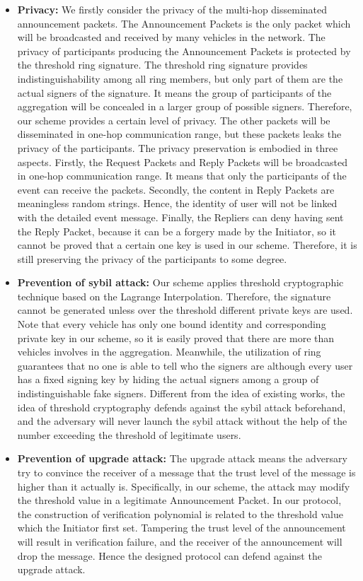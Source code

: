 \documentclass[a4paper]{article}
\begin{document}
\begin{itemize}
  \item \textbf{Privacy:} We firstly consider the privacy of the multi-hop disseminated announcement packets. The Announcement Packets is the only packet which will be broadcasted and received by many vehicles in the network. The privacy of participants producing the Announcement Packets is protected by the threshold ring signature. The threshold ring signature provides indistinguishability among all ring members, but only part of them are the actual signers of the signature. It means the group of participants of the aggregation will be concealed in a larger group of possible signers. Therefore, our scheme provides a certain level of privacy. The other packets will be disseminated in one-hop communication range, but these packets leaks the privacy of the participants. The privacy preservation is embodied in three aspects. Firstly, the Request Packets and Reply Packets will be broadcasted in one-hop communication range. It means that only the participants of the event can receive the packets. Secondly, the content in Reply Packets are meaningless random strings. Hence, the identity of user will not be linked with the detailed event message. Finally, the Repliers can deny having sent the Reply Packet, because it can be a forgery made by the Initiator, so it cannot be proved that a certain one key is used in our scheme. Therefore, it is still preserving the privacy of the participants to some degree.
  \item \textbf{Prevention of sybil attack:} Our scheme applies threshold cryptographic technique based on the Lagrange Interpolation. Therefore, the signature cannot be generated unless over the threshold different private keys are used. Note that every vehicle has only one bound identity and corresponding private key in our scheme, so it is easily proved that there are more than  vehicles involves in the aggregation. Meanwhile, the utilization of ring guarantees that no one is able to tell who the signers are although every user has a fixed signing key by hiding the actual signers among a group of indistinguishable fake signers. Different from the idea of existing works, the idea of threshold cryptography defends against the sybil attack beforehand, and the adversary will never launch the sybil attack without the help of the number exceeding the threshold of legitimate users.
  \item \textbf{Prevention of upgrade attack:} The upgrade attack means the adversary try to convince the receiver of a message that the trust level of the message is higher than it actually is. Specifically, in our scheme, the attack may modify the threshold value in a legitimate Announcement Packet. In our protocol, the construction of verification polynomial is related to the threshold value which the Initiator first set. Tampering the trust level of the announcement will result in verification failure, and the receiver of the announcement will drop the message. Hence the designed protocol can defend against the upgrade attack.

\end{itemize}
\end{document}
